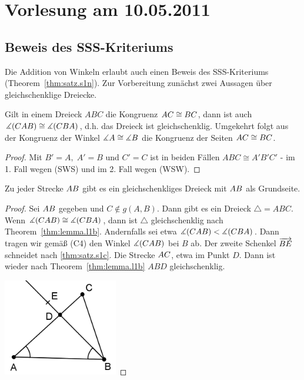 \section*{Vorlesung am 10.05.2011}

\subsection*{Beweis des SSS-Kriteriums}

Die Addition von Winkeln erlaubt auch einen Beweis des SSS-Kriteriums (Theorem~\ref{thm:satz.s1n}).
Zur Vorbereitung zunächst zwei Aussagen über gleichschenklige Dreiecke.

\begin{thm}\label{thm:lemma.l1b}
    Gilt in einem Dreieck $ABC$ die Kongruenz ${AC} \cong {BC}$, dann ist auch $\mbox{$\measuredangle$}(CAB)
    \cong \mbox{$\measuredangle$}(CBA)$, d.h. das Dreieck ist gleichschenklig. Umgekehrt folgt aus der Kongruenz der
    Winkel $\mbox{$\measuredangle$} A \cong \mbox{$\measuredangle$} B$ die Kongruenz der Seiten ${AC} \cong {BC}$.
\end{thm}

\begin{proof}
    Mit $B' = A,\;A' = B$ und $C' = C$ ist in beiden Fällen $ABC \cong A'B'C'$ - im 1. Fall wegen
    (SWS) und im 2. Fall wegen (WSW).
\end{proof}

\begin{thm}\label{thm:folg.f1a}
    Zu jeder Strecke ${AB}$ gibt es ein gleichschenkliges Dreieck mit ${AB}$ als Grundseite.
\end{thm}

\begin{proof}
    Sei ${AB}$ gegeben und $C \notin g(A,B)$. Dann gibt es ein Dreieck $\triangle= ABC$. Wenn
    $\mbox{$\measuredangle$}(CAB)\cong\mbox{$\measuredangle$}(CBA)$, dann ist $\triangle$ gleichschenklig nach Theorem~\ref{thm:lemma.l1b}.
    Andernfalls sei etwa $\mbox{$\measuredangle$}(CAB) < \mbox{$\measuredangle$}(CBA)$.  Dann tragen wir gemäß (C4) den Winkel $\mbox{$\measuredangle$}(CAB)$
    bei $B$ ab. Der zweite Schenkel $\mbox{${\overrightarrow{BE}}$}$ schneidet nach \ref{thm:satz.s1c}. Die Strecke
    ${AC}$, etwa im Punkt $D$. Dann ist wieder nach Theorem~\ref{thm:lemma.l1b} $ABD$
    gleichschenklig.

    \centerline{\includegraphics[width=5cm]{BILDER/1-2-20-Dreieck.png}}
\end{proof}

